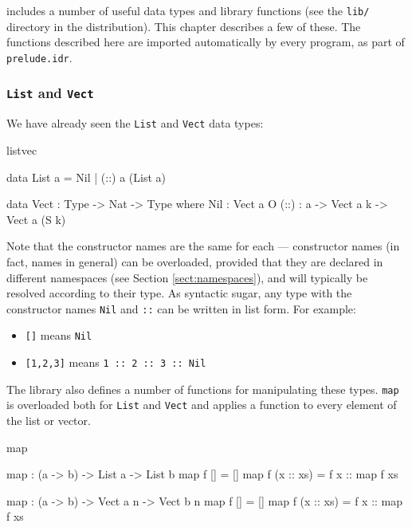 \Idris{} includes a number of useful data types and library functions (see the
\texttt{lib/} directory in the distribution). This chapter describes a few of these. The
functions described here are imported automatically by every \Idris{} program, as
part of \texttt{prelude.idr}.

\subsubsection{\texttt{List} and \texttt{Vect}}

We have already seen the \texttt{List} and \texttt{Vect} data types:

\begin{SaveVerbatim}{listvec}

data List a = Nil | (::) a (List a)

data Vect : Type -> Nat -> Type where
   Nil  : Vect a O
   (::) : a -> Vect a k -> Vect a (S k)

\end{SaveVerbatim}

\noindent
Note that the constructor names are the same for each --- constructor names (in
fact, names in general) can be overloaded, provided that they are declared in
different namespaces (see Section \ref{sect:namespaces}), and will typically be
resolved according to their type. As syntactic sugar, any type with the constructor
names \texttt{Nil} and \texttt{::} can be written in list form. For example:

\begin{itemize}
\item \texttt{[]} means \texttt{Nil}
\item \texttt{[1,2,3]} means \texttt{1 :: 2 :: 3 :: Nil}
\end{itemize}

\noindent
The library also defines a number of functions for manipulating these types.
\texttt{map} is overloaded both for \texttt{List} and \texttt{Vect}
and applies a function to every element of the list or vector.

\begin{SaveVerbatim}{map}

map : (a -> b) -> List a -> List b
map f []        = []
map f (x :: xs) = f x :: map f xs

map : (a -> b) -> Vect a n -> Vect b n
map f []        = []
map f (x :: xs) = f x :: map f xs

\end{SaveVerbatim}

